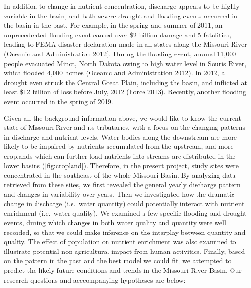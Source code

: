 \documentclass[12pt,]{article}
\begin{document}
In addition to change in nutrient concentration, discharge appears to be
highly variable in the basin, and both severe drought and flooding
events occurred in the basin in the past. For example, in the spring and
summer of 2011, an unprecedented flooding event caused over \$2 billion
damage and 5 fatalities, leading to FEMA disaster declaration made in
all states along the Missouri River (Oceanic and Administration 2012).
During the flooding event, around 11,000 people evacuated Minot, North
Dakota owing to high water level in Souris River, which flooded 4,000
homes (Oceanic and Administration 2012). In 2012, a drought even struck
the Central Great Plain, including the basin, and inflicted at least
\$12 billion of loss before July, 2012 (Force 2013). Recently, another
flooding event occurred in the spring of 2019.

Given all the background information above, we would like to know the
current state of Missouri River and its tributaries, with a focus on the
changing patterns in discharge and nutrient levels. Water bodies along
the downstream are more likely to be impaired by nutrients accumulated
from the upstream, and more croplands which can further load nutrients
into streams are distributed in the lower basins
(\autoref{fig:cropland}). Therefore, in the present project, study sites
were concentrated in the southeast of the whole Missouri Basin. By
analyzing data retrieved from these sites, we first revealed the general
yearly discharge pattern and changes in variability over years. Then we
investigated how the dramatic change in discharge (i.e.~water quantity)
could potentially interact with nutrient enrichment (i.e.~water
quality). We examined a few specific flooding and drought events, during
which changes in both water quality and quantity were well recorded, so
that we could make inference on the interplay between quantity and
quality. The effect of population on nutrient enrichment was also
examined to illustrate potential non-agricultural impact from human
activities. Finally, based on the pattern in the past and the best model
we could fit, we attempted to predict the likely future conditions and
trends in the Missouri River Basin. Our research questions and
acccompanying hypotheses are below:
\end{document}
